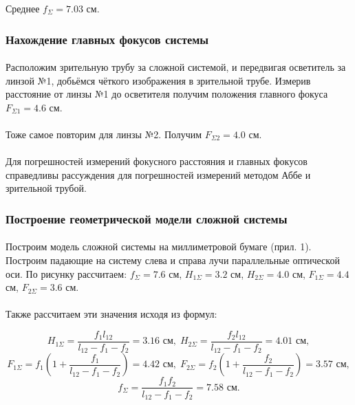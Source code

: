 \documentclass[a4paper,12pt]{article} %
\begin{document}
\noindent Среднее $f_\Sigma = 7.03$ см.

\subsubsection{Нахождение главных фокусов системы}

\paragraph{} Расположим зрительную трубу за сложной системой, и передвигая осветитель за линзой №1, добьёмся чёткого изображения в зрительной трубе. Измерив расстояние от линзы №1 до осветителя получим положения главного фокуса $F_{\Sigma 1} = 4.6$ см.

\paragraph{} Тоже самое повторим для линзы №2. Получим $F_{\Sigma 2} = 4.0$ см.

\paragraph{} Для погрешностей измерений фокусного расстояния и главных фокусов справедливы рассуждения для погрешностей измерений методом Аббе и зрительной трубой.

\subsubsection{Построение геометрической модели сложной системы} 

\paragraph{} Построим модель сложной системы на миллиметровой бумаге (прил. 1). Построим падающие на систему слева и справа лучи параллельные оптической оси. По рисунку рассчитаем: $f_\Sigma = 7.6$ см, $H_{1\Sigma} = 3.2$ см, $H_{2\Sigma} = 4.0$ см, $F_{1\Sigma} = 4.4$ см, $F_{2\Sigma} = 3.6$ см.

\paragraph{} Также рассчитаем эти значения исходя из формул:

\[
H_{1\Sigma} = \frac{f_1 l_{12}}{l_{12} - f_1 - f_2} = 3.16 \text{ см}, \; H_{2\Sigma} = \frac{f_2 l_{12}}{l_{12} - f_1 - f_2} = 4.01 \text{ см},
\]\[
F_{1\Sigma} = f_1\left( 1 + \frac{f_1}{l_{12} - f_1 - f_2}\right) = 4.42 \text{ см}, \; F_{2\Sigma} = f_2\left( 1 + \frac{f_2}{l_{12} - f_1 - f_2}\right) = 3.57 \text{ см},
\]\[
f_\Sigma = \frac{f_1 f_2}{l_{12} - f_1 - f_2} = 7.58 \text{ см}.
\]
\end{document}
